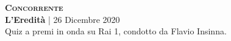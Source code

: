 \textbf{\textsc{Concorrente}} \\
\textbf{L'Eredità} | 26 Dicembre 2020 \\
Quiz a premi in onda su Rai 1, condotto da Flavio Insinna.
\begin{center}
    \label{fig:eredita}	
\end{center}